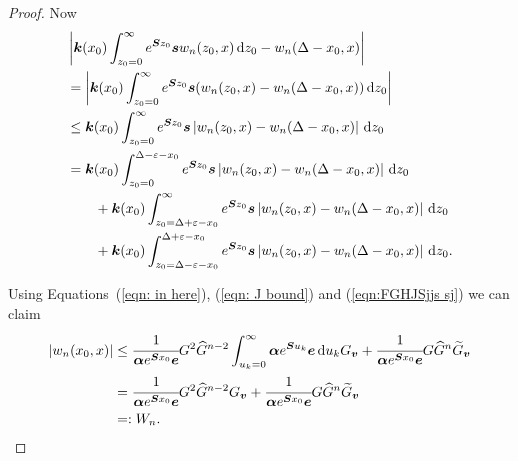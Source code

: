 \begin{proof}
	Now
	\begin{align}
		\nonumber&\left|\boldsymbol k(x_0) \int_{z_0=0}^\infty e^{\boldsymbol Sz_0}\boldsymbol sw_n(z_0,x)\, \mathrm{d} z_0 - w_n(\Delta - x_0,x) \right|
		\\\nonumber&= \left|\boldsymbol k(x_0) \int_{z_0=0}^\infty e^{\boldsymbol Sz_0}\boldsymbol s(w_n(z_0,x) - w_n(\Delta - x_0,x)) \, \mathrm{d} z_0\right|
		\\\nonumber&\leq \boldsymbol k(x_0) \int_{z_0=0}^\infty e^{\boldsymbol Sz_0}\boldsymbol s  \left|w_n(z_0,x) - w_n(\Delta - x_0,x)\right| \, \mathrm{d} z_0
		\\\nonumber&= \boldsymbol k(x_0) \int_{z_0=0}^{\Delta-\varepsilon-x_0} e^{\boldsymbol Sz_0}\boldsymbol s  \left|w_n(z_0,x) - w_n(\Delta - x_0,x)\right| \, \mathrm{d} z_0
		\\\nonumber&\qquad{}+\boldsymbol k(x_0) \int_{z_0=\Delta+\varepsilon-x_0}^\infty e^{\boldsymbol Sz_0}\boldsymbol s  \left|w_n(z_0,x) - w_n(\Delta - x_0,x)\right| \, \mathrm{d} z_0
		\\\label{eqn: KASJF}&\qquad{}+\boldsymbol k(x_0) \int_{z_0=\Delta-\varepsilon-x_0}^{\Delta+\varepsilon-x_0} e^{\boldsymbol Sz_0}\boldsymbol s  \left|w_n(z_0,x) - w_n(\Delta - x_0,x)\right| \, \mathrm{d} z_0.
	\end{align}
		
		Using Equations~(\ref{eqn: in here}), (\ref{eqn: J bound}) and (\ref{eqn:FGHJSjjs sj}) we can claim
		\begin{align}
			|w_n(x_0,x)| &\leq \cfrac{1}{\boldsymbol \alpha e^{\boldsymbol{S} x_0}\boldsymbol e}G^2 \widehat G^{n-2}  
			\int_{u_k=0}^\infty \boldsymbol \alpha e^{\boldsymbol{S}u_k}\boldsymbol e \, \mathrm{d} u_k G_{\boldsymbol v} + \cfrac{1}{\boldsymbol \alpha e^{\boldsymbol{S}x_0}\boldsymbol e}G\widehat G^{n}\widetilde G_{\boldsymbol v} \nonumber 
			\\& = \cfrac{1}{\boldsymbol \alpha e^{\boldsymbol{S} x_0}\boldsymbol e}G^2
			 \widehat G^{n-2} G_{\boldsymbol v} + \cfrac{1}{\boldsymbol \alpha e^{\boldsymbol{S}x_0}\boldsymbol e}G\widehat G^{n}\widetilde G_{\boldsymbol v} \nonumber 
			 \\&=:W_n.
		\end{align}
		

\end{proof}
